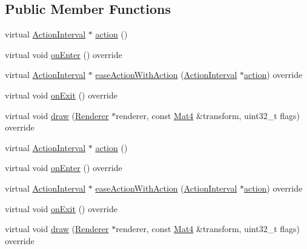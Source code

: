 \subsection*{Public Member Functions}
\begin{DoxyCompactItemize}
\item 
virtual \hyperlink{classActionInterval}{Action\+Interval} $\ast$ \hyperlink{classTransitionSplitCols_a8b6074132330415cb925e15378363462}{action} ()
\item 
virtual void \hyperlink{classTransitionSplitCols_ad172cf3e4da16ebf82ca1efbaaaacdc1}{on\+Enter} () override
\item 
virtual \hyperlink{classActionInterval}{Action\+Interval} $\ast$ \hyperlink{classTransitionSplitCols_a0a9a7b0062cf654a712a17887d4db251}{ease\+Action\+With\+Action} (\hyperlink{classActionInterval}{Action\+Interval} $\ast$\hyperlink{classTransitionSplitCols_a8b6074132330415cb925e15378363462}{action}) override
\item 
virtual void \hyperlink{classTransitionSplitCols_af083146c10d56bb5342ae286c2967e67}{on\+Exit} () override
\item 
virtual void \hyperlink{classTransitionSplitCols_af9a2190cb947a62c0d04544cd7db6c5e}{draw} (\hyperlink{classRenderer}{Renderer} $\ast$renderer, const \hyperlink{classMat4}{Mat4} \&transform, uint32\+\_\+t flags) override
\item 
virtual \hyperlink{classActionInterval}{Action\+Interval} $\ast$ \hyperlink{classTransitionSplitCols_aade19b41200d84779b305e1a6062898a}{action} ()
\item 
virtual void \hyperlink{classTransitionSplitCols_abcf9feef35de88cbc529d3a134f7f098}{on\+Enter} () override
\item 
virtual \hyperlink{classActionInterval}{Action\+Interval} $\ast$ \hyperlink{classTransitionSplitCols_a4e9f0eafce932c38cb22e5551f487661}{ease\+Action\+With\+Action} (\hyperlink{classActionInterval}{Action\+Interval} $\ast$\hyperlink{classTransitionSplitCols_a8b6074132330415cb925e15378363462}{action}) override
\item 
virtual void \hyperlink{classTransitionSplitCols_aaf1b4e4345002bda3404ae89e10d5fe1}{on\+Exit} () override
\item 
virtual void \hyperlink{classTransitionSplitCols_a9f037138c420fcf93178ce48688d4910}{draw} (\hyperlink{classRenderer}{Renderer} $\ast$renderer, const \hyperlink{classMat4}{Mat4} \&transform, uint32\+\_\+t flags) override
\end{DoxyCompactItemize}
